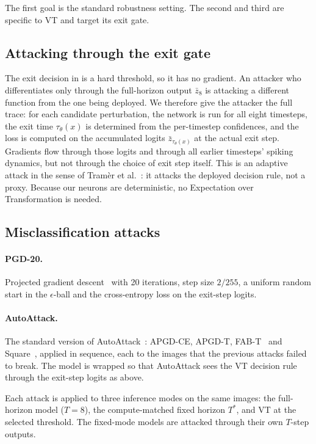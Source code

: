 The first goal is the standard robustness setting. The second and third are specific to VT and target its exit gate.

\subsection{Attacking through the exit gate}

The exit decision in  is a hard threshold, so it has no gradient. An attacker who differentiates only through the full-horizon output $\bar{z}_8$ is attacking a different function from the one being deployed. We therefore give the attacker the full trace: for each candidate perturbation, the network is run for all eight timesteps, the exit time $\tau_\theta(x)$ is determined from the per-timestep confidences, and the loss is computed on the accumulated logits $\bar{z}_{\tau_\theta(x)}$ at the actual exit step. Gradients flow through those logits and through all earlier timesteps' spiking dynamics, but not through the choice of exit step itself. This is an adaptive attack in the sense of Tram\`er et al.~\cite{tramer2020adaptive}: it attacks the deployed decision rule, not a proxy. Because our neurons are deterministic, no Expectation over Transformation is needed.

\subsection{Misclassification attacks}

\paragraph{PGD-20.} Projected gradient descent~\cite{madry2018towards} with 20 iterations, step size $2/255$, a uniform random start in the $\epsilon$-ball and the cross-entropy loss on the exit-step logits.

\paragraph{AutoAttack.} The standard version of AutoAttack~\cite{croce2020reliable}: APGD-CE, APGD-T, FAB-T~\cite{croce2020minimally} and Square~\cite{andriushchenko2020square}, applied in sequence, each to the images that the previous attacks failed to break. The model is wrapped so that AutoAttack sees the VT decision rule through the exit-step logits as above.

Each attack is applied to three inference modes on the same images: the full-horizon model ($T = 8$), the compute-matched fixed horizon $T^{*}$, and VT at the selected threshold. The fixed-mode models are attacked through their own $T$-step outputs.

